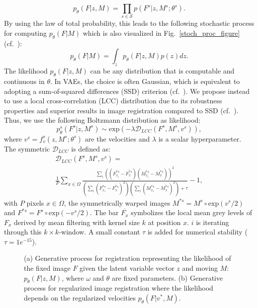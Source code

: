 \documentclass[journal]{IEEEtran}
\begin{document}
\begin{equation}\label{outputdist}
p_\theta(F | z,M) = \prod_{s\in \mathcal{S}} p(F^s | z,M^s;\theta^s).
\end{equation}
By using the law of total probability, this leads to the following stochastic process for computing $p_\theta(F|M)$ which is also visualized in Fig.~\ref{stoch_proc_figure} (cf.\ \cite{kingma2014semi}):
\begin{equation}\label{stochPrc}
p_\theta(F|M) = \int_z p_\theta(F | z,M) p(z) dz.
\end{equation}
The likelihood $p_\theta(F | z,M)$ can be any distribution that is computable and continuous in $\theta$. In VAEs, the choice is often Gaussian, which is equivalent to adopting a sum-of-squared differences (SSD) criterion (cf.\ \cite{kingma2013auto}). We propose instead to use a local cross-correlation (LCC) distribution due to its robustness properties and superior results in image registration compared to SSD (cf.\ \cite{lorenzi2013lcc,avants2011reproducible}). Thus, we use the following Boltzmann distribution as likelihood:
\begin{equation}\label{lcc}
p_\theta^{s}(F^s | z,M^s) \sim \text{exp}(-\lambda \mathcal{D}_{LCC}(F^s,M^s,v^s)),
\end{equation}
where $v^s=f^s_{v}(z, M^s; \theta^s)$ are the velocities and $\lambda$ is a scalar hyperparameter. The symmetric $\mathcal{D}_{LCC}$ is defined as: 
\begin{multline}\label{normLCCDef}
\mathcal{D}_\textit{LCC}(F^s,M^s,v^s) = \\ \frac{1}{P} \sum_{x \in \Omega}  \frac{\sum_i \left(\left(F^{*s}_{x_i} - \overline{F^{*s}_x}\right)\left(M^{*s}_{x_i} - \overline{M^{*s}_x}\right)\right)^2}{\left(\sum_i \left(F^{*s}_{x_i} - \overline{F^{*s}_x}\right)^2\right) \left(\sum_i \left(M^{*s}_{x_i} - \overline{M^{*s}_x}\right)^2\right) + \tau} - 1,
\end{multline}
with $P$ pixels $x\in \Omega$, the symmetrically warped images $M^{*s}=M^s\circ \text{exp}\left(v^s/2\right)$ and $F^{*s}=F^s\circ \text{exp}\left(-v^s/2\right)$. The bar $\overline{F_x}$ symbolizes the local mean grey levels of $F_x$ derived by mean filtering with kernel size $k$ at position $x$. $i$ is iterating through this $k\times k$-window. A small constant $\tau$ is added for numerical stability ($\tau=1e^{-15}$). 

\begin{figure}[tb]
\centering 
{}\hfill
{}
\caption{\small{(a) Generative process for registration representing the likelihood of the fixed image $F$ given the latent variable vector $z$ and moving $M$: $p_\theta(F|z,M)$, where $\omega$ and $\theta$ are fixed parameters. (b) Generative process for regularized image registration where the likelihood depends on the regularized velocities $p_\theta(F|v^*,M)$.}}
\end{figure}
\end{document}

